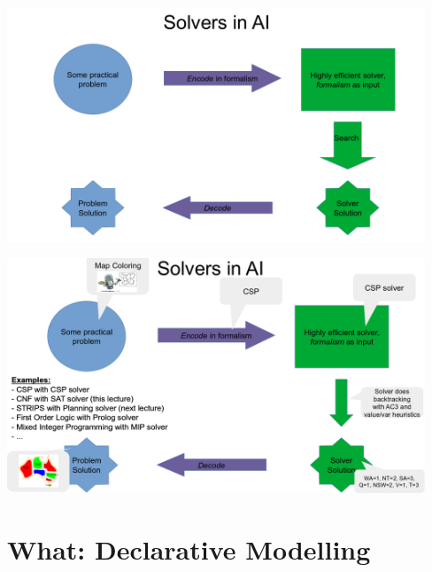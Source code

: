 \documentclass{cons-beamer}
\begin{document}
\begin{frame}
  \includegraphics[height=70mm]{images/encode_search_decode.png}
\end{frame}

\begin{frame}
  \includegraphics[height=70mm]{images/encode_search_decode_example.png}
\end{frame}


\section{What: Declarative Modelling}
\end{document}
